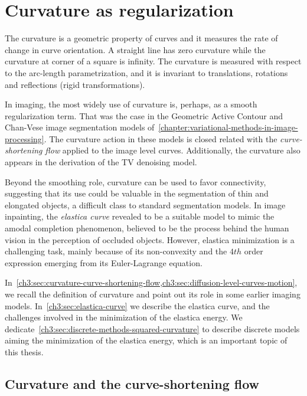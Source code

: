 \chapter{Curvature as regularization}
\label{chapter:curvature-prior}

The curvature is a geometric property of curves and it measures the rate of change in curve orientation. A straight line has zero curvature while the curvature at corner of a square is infinity. The curvature is measured with respect to the arc-length parametrization, and it is invariant to translations, rotations and reflections (rigid transformations).

In imaging, the most widely use of curvature is, perhaps, as a smooth regularization term. That was the case in the Geometric Active Contour and Chan-Vese image segmentation models of~\cref{chapter:variational-methods-in-image-processing}. The curvature action in these models is closed related with the \emph{curve-shortening flow} applied to the image level curves. Additionally, the curvature also appears in the derivation of the TV denoising model.

Beyond the smoothing role, curvature can be used to favor connectivity, suggesting that its use could be valuable in the segmentation of thin and elongated objects, a difficult class to standard segmentation models. In image inpainting, the \emph{elastica curve} revealed to be a suitable model to mimic the amodal completion phenomenon, believed to be the process behind the human vision in the perception of occluded objects. However, elastica minimization is a challenging task, mainly because of its non-convexity and the $4th$ order expression emerging from its Euler-Lagrange equation.

In~\cref{ch3:sec:curvature-curve-shortening-flow,ch3:sec:diffusion-level-curves-motion}, we recall the definition of curvature and point out its role in some earlier imaging models. In~\cref{ch3:sec:elastica-curve} we describe the elastica curve, and the challenges involved in the minimization of the elastica energy. We dedicate~\cref{ch3:sec:discrete-methods-squared-curvature} to describe discrete models aiming the minimization of the elastica energy, which is an important topic of this thesis.



\section{Curvature and the curve-shortening flow}
\label{ch3:sec:curvature-curve-shortening-flow}


